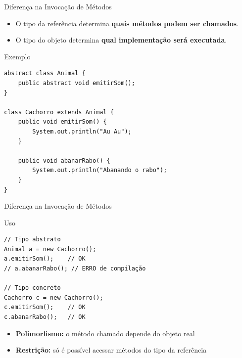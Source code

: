 \documentclass[9pt]{beamer}
\begin{document}
\begin{frame}[fragile]{Diferença na Invocação de Métodos}
\begin{itemize}
    \item O tipo da referência determina \textbf{quais métodos podem ser chamados}.
    \item O tipo do objeto determina \textbf{qual implementação será executada}.
\end{itemize}

\vspace{0.3cm}

\begin{block}{Exemplo}
\begin{verbatim}
abstract class Animal {
    public abstract void emitirSom();
}

class Cachorro extends Animal {
    public void emitirSom() {
        System.out.println("Au Au");
    }

    public void abanarRabo() {
        System.out.println("Abanando o rabo");
    }
}
\end{verbatim}
\end{block}
\end{frame}

\begin{frame}[fragile]{Diferença na Invocação de Métodos}

\begin{block}{Uso}
\begin{verbatim}
// Tipo abstrato
Animal a = new Cachorro();
a.emitirSom();    // OK
// a.abanarRabo(); // ERRO de compilação

// Tipo concreto
Cachorro c = new Cachorro();
c.emitirSom();    // OK
c.abanarRabo();   // OK
\end{verbatim}
\end{block}

\vspace{0.3cm}

\begin{itemize}
    \item \textbf{Polimorfismo:} o método chamado depende do objeto real
    \item \textbf{Restrição:} só é possível acessar métodos do tipo da referência
\end{itemize}

\end{frame}
\end{document}
